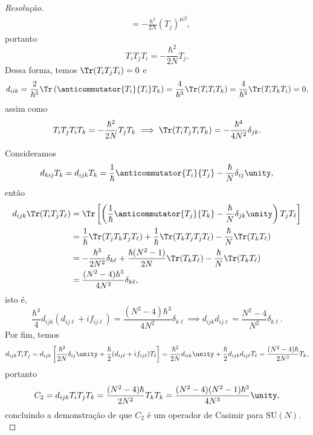 \begin{proof}[Resolução]
\begin{align*}
                                  &= - \frac{\hbar^2}{2N} (T_j)^{\mu \beta},
    \end{align*}
    portanto
    \begin{equation*}
        T_i T_j T_i = - \frac{\hbar^2}{2N} T_j.
    \end{equation*}
    Dessa forma, temos \(\Tr(T_i T_j T_i) = 0\) e
    \begin{equation*}
        d_{iik} = \frac{2}{\hbar^3} \Tr\left(\anticommutator{T_i}{T_i} T_k\right) = \frac{4}{\hbar^3} \Tr(T_i T_i T_k) = \frac{4}{\hbar^3} \Tr(T_i T_k T_i) = 0,
    \end{equation*}
    assim como
    \begin{equation*}
        T_i T_j T_i T_k = - \frac{\hbar^2}{2N} T_j T_k \implies \Tr(T_i T_j T_i T_k) = - \frac{\hbar^4}{4N^2} \delta_{jk}.
    \end{equation*}

    Consideramos
    \begin{equation*}
        d_{kij} T_k = d_{ijk} T_k = \frac{1}{\hbar}\anticommutator{T_i}{T_j} - \frac{\hbar}{N}\delta_{ij}\unity,
    \end{equation*}
    então
    \begin{align*}
        d_{ijk} \Tr(T_i T_j T_\ell) &= \Tr\left[\left(\frac{1}{\hbar}\anticommutator{T_j}{T_k} - \frac{\hbar}{N} \delta_{jk} \unity\right)T_j T_\ell\right]\\
                                    &= \frac{1}{\hbar}\Tr(T_j T_k T_j T_\ell) + \frac1{\hbar}\Tr(T_k T_j T_j T_\ell) - \frac{\hbar}{N} \Tr(T_k T_\ell)\\
                                    &= - \frac{\hbar^3}{2N^2} \delta_{k \ell} + \frac{\hbar(N^2 - 1)}{2N}\Tr(T_k T_\ell) - \frac{\hbar}{N} \Tr(T_k T_\ell)\\
                                    &= \frac{(N^2 - 4)\hbar^3}{4N^2} \delta_{k \ell},
    \end{align*}
    isto é, 
    \begin{equation*}
        \frac{\hbar^3}{4}d_{ijk} (d_{ij\ell} + i f_{ij\ell}) = \frac{(N^2 - 4)\hbar^3}{4N^2} \delta_{k \ell} \implies d_{ijk} d_{ij\ell} = \frac{N^2 - 4}{N^2} \delta_{k\ell}.
    \end{equation*}
    Por fim, temos
    \begin{equation*}
        d_{ijk}T_i T_j = d_{ijk}\left[\frac{\hbar^2}{2N} \delta_{ij} \unity + \frac{\hbar}{2} (d_{ij\ell} + i f_{ij\ell})T_\ell\right] = \frac{\hbar^2}{2N} d_{iik} \unity + \frac{\hbar}{2} d_{ijk} d_{ij\ell} T_\ell = \frac{(N^2 - 4)\hbar}{2N^2} T_k,
    \end{equation*}
    portanto
    \begin{equation*}
        C_2 = d_{ijk}T_i T_j T_k = \frac{(N^2 - 4)\hbar}{2N^2} T_k T_k = \frac{(N^2 - 4)(N^2 - 1)\hbar^3}{4N^3} \unity,
    \end{equation*}
    concluindo a demonstração de que \(C_2\) é um operador de Casimir para \(\mathrm{SU}(N).\)
\end{proof}
